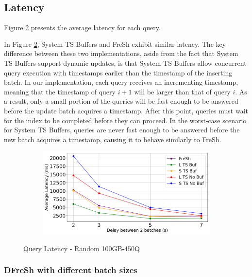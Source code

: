 \subsection{Latency}

Figure \ref{fig:latency-random} presents the average latency for each query. 

In Figure \ref{fig:latency-random}, System TS Buffers and FreSh exhibit similar latency. 
The key difference between these two implementations, aside from the fact that System TS Buffers 
support dynamic updates, is that System TS Buffers allow concurrent query execution with timestamps 
earlier than the timestamp of the inserting batch. In our implementation, each query receives 
an incrementing timestamp, meaning that the timestamp of query $i+1$ will be larger than that 
of query $i$. As a result, only a small portion of the queries will be fast enough to be answered
before the update batch acquires a timestamp. After this point, queries must wait for the index to 
be completed before they can proceed. In the worst-case scenario for System TS Buffers, queries 
are never fast enough to be answered before the new batch acquires a timestamp, causing it to 
behave similarly to FreSh.

\begin{figure}
	\centering
	\begin{subfigure}[c]{0.6\textwidth}
		\includegraphics[width=1\textwidth]   {figures/Experiments/Dynamic/Latency/average_latency.png}
		\label{fig:average-latency}
	\end{subfigure}
	\caption{Query Latency - Random 100GB-450Q}
	\label{fig:latency-random}
\end{figure}

\subsubsection{DFreSh with different batch sizes}

